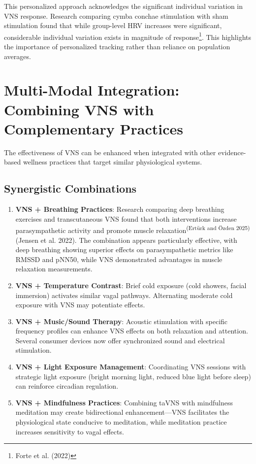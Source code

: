 \documentclass[
  Letterpaper,
]{scrbook}
\begin{document}
This personalized approach acknowledges the significant individual
variation in VNS response. Research comparing cymba conchae stimulation
with sham stimulation found that while group-level HRV increases were
significant, considerable individual variation exists in magnitude of
response\footnote{Forte et al. (2022)}. This highlights the importance
of personalized tracking rather than reliance on population averages.

\section{Multi-Modal Integration: Combining VNS with Complementary
Practices}\label{multi-modal-integration-combining-vns-with-complementary-practices}

The effectiveness of VNS can be enhanced when integrated with other
evidence-based wellness practices that target similar physiological
systems.

\subsection{Synergistic Combinations}\label{synergistic-combinations}

\begin{enumerate}
\def\labelenumi{\arabic{enumi}.}
\item
  \textbf{VNS + Breathing Practices}: Research comparing deep breathing
  exercises and transcutaneous VNS found that both interventions
  increase parasympathetic activity and promote muscle
  relaxation\textsuperscript{(Ertürk and Özden 2025)}(Jensen et al.
  2022). The combination appears particularly effective, with deep
  breathing showing superior effects on parasympathetic metrics like
  RMSSD and pNN50, while VNS demonstrated advantages in muscle
  relaxation measurements.
\item
  \textbf{VNS + Temperature Contrast}: Brief cold exposure (cold
  showers, facial immersion) activates similar vagal pathways.
  Alternating moderate cold exposure with VNS may potentiate effects.
\item
  \textbf{VNS + Music/Sound Therapy}: Acoustic stimulation with specific
  frequency profiles can enhance VNS effects on both relaxation and
  attention. Several consumer devices now offer synchronized sound and
  electrical stimulation.
\item
  \textbf{VNS + Light Exposure Management}: Coordinating VNS sessions
  with strategic light exposure (bright morning light, reduced blue
  light before sleep) can reinforce circadian regulation.
\item
  \textbf{VNS + Mindfulness Practices}: Combining taVNS with mindfulness
  meditation may create bidirectional enhancement---VNS facilitates the
  physiological state conducive to meditation, while meditation practice
  increases sensitivity to vagal effects.
\end{enumerate}
\end{document}
